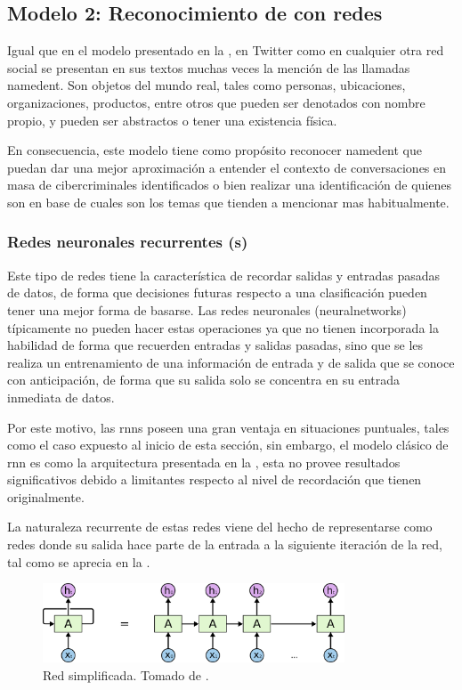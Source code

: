 \subsection{Modelo 2: Reconocimiento de  con redes }
Igual que en el modelo presentado en la , en Twitter como en cualquier otra red social se presentan en sus textos muchas veces la mención de las llamadas \gls{namedent}. Son objetos del mundo real, tales como personas, ubicaciones, organizaciones, productos, entre otros que pueden ser denotados con nombre propio, y pueden ser abstractos o tener una existencia física.

En consecuencia, este modelo tiene como propósito reconocer \gls{namedent} que puedan dar una mejor aproximación a entender el contexto de conversaciones en masa de cibercriminales identificados o bien realizar una identificación de quienes son en base de cuales son los temas que tienden a mencionar mas habitualmente.

\subsubsection{Redes neuronales recurrentes (s)}
Este tipo de redes tiene la característica de recordar salidas y entradas pasadas de datos, de forma que decisiones futuras respecto a una clasificación pueden tener una mejor forma de basarse. Las redes neuronales (\glspl{neuralnetwork}) típicamente no pueden hacer estas operaciones ya que no tienen incorporada la habilidad de forma que recuerden entradas y salidas pasadas, sino que se les realiza un entrenamiento de una información de entrada y de salida que se conoce con anticipación, de forma que su salida solo se concentra en su entrada inmediata de datos.

Por este motivo, las \glspl{rnn} poseen una gran ventaja en situaciones puntuales, tales como el caso expuesto al inicio de esta sección, sin embargo, el modelo clásico de \gls{rnn} es como la arquitectura presentada en la , esta no provee resultados significativos debido a limitantes respecto al nivel de recordación que tienen originalmente.

La naturaleza recurrente de estas redes viene del hecho de representarse como redes donde su salida hace parte de la entrada a la siguiente iteración de la red, tal como se aprecia en la .

\begin{figure}[H]
  \centering
  \includegraphics[width=0.8\textwidth]{Figures/RNN-unrolled.png}
\decoRule
\caption[Red  simplificada]{Red  simplificada. Tomado de \cite{understanding-lstm}.}
\label{fig:rnn-classic-simple}
\end{figure}

